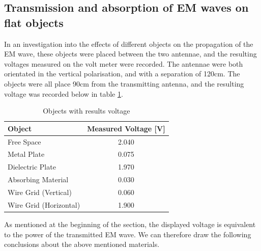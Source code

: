 \documentclass[11pt,a4paper]{article}
\begin{document}
\subsection{Transmission and absorption of EM waves on flat objects}\label{sec:objectsInPath}
In an investigation into the effects of different objects on the propagation of the EM wave, these objects were placed between the two antennae, and the resulting voltages measured on the volt meter were recorded. The antennae were both orientated in the vertical polarisation, and with a separation of 120cm. The objects were all place 90cm from the transmitting antenna, and the resulting voltage was recorded below in table \ref{tab:1_3resutls}. \\

\begin{table}[H]
\centering
\caption{Objects with results voltage}
\label{tab:1_3resutls}
\begin{tabular}{| l | c |}
  \hline
\textbf{Object} & \textbf{Measured Voltage [V]}\\ \hline
Free Space  & 2.040 \\ \hline
Metal Plate & 0.075 \\ \hline
Dielectric Plate  & 1.970 \\ \hline
Absorbing Material  & 0.030 \\ \hline
Wire Grid (Vertical)  & 0.060 \\ \hline
Wire Grid (Horizontal)  & 1.900 \\ \hline
\end{tabular}
\end{table}

As mentioned at the beginning of the section, the displayed voltage is equivalent to the power of the transmitted EM wave. We can therefore draw the following conclusions about the above mentioned materials.\\
\end{document}
